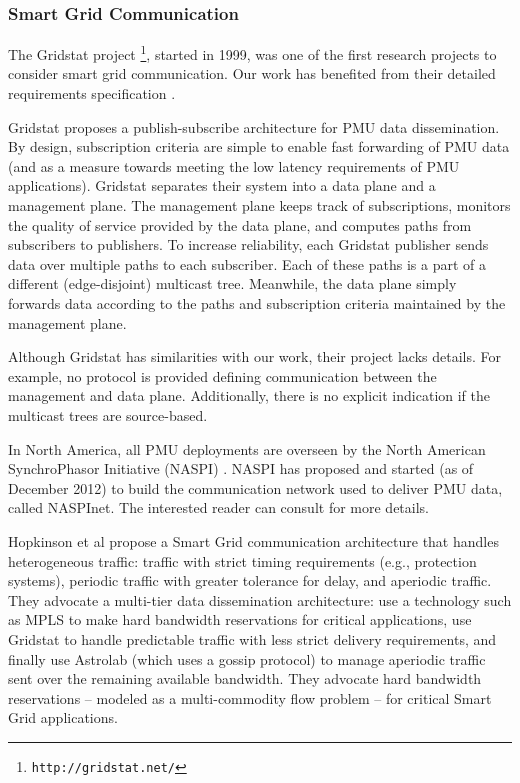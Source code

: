 \subsubsection{Smart Grid Communication}


The Gridstat project \footnote{{\tt http://gridstat.net/}}, started in 1999, was one of the first research projects to consider smart grid communication.  Our work has benefited from their %
detailed requirements specification \cite{Bakken11}.

Gridstat proposes a publish-subscribe architecture for PMU data dissemination. By design, subscription criteria are simple to enable fast forwarding of PMU data
(and as a measure towards meeting the low latency requirements of PMU applications).  
Gridstat separates their system into a data plane and a management plane. The management plane keeps track of subscriptions,
monitors the quality of service provided by the data plane, and computes paths from subscribers to publishers.  To increase reliability, each Gridstat publisher sends data over multiple paths
to each subscriber. Each of these paths is a part of a different (edge-disjoint) multicast tree.  Meanwhile, the data plane simply forwards data according to the paths and subscription 
criteria maintained by the management plane.  

Although Gridstat has similarities with our work, their project lacks details.  For example, no protocol is provided defining communication between the management and data plane. 
Additionally, there is no explicit indication if the multicast trees are source-based.

In North America, all PMU deployments are overseen by the North American SynchroPhasor Initiative (NASPI) \cite{Naspi10}.  NASPI has proposed and started (as of December 2012) to build the
communication network used to deliver PMU data, called NASPInet. The interested reader can consult \cite{Naspi10} for more details.


Hopkinson et al \cite{Hopkinson09} propose a Smart Grid communication architecture that handles heterogeneous traffic: traffic with strict timing requirements (e.g., protection systems), 
periodic traffic with greater tolerance for delay, and aperiodic traffic. They advocate a multi-tier data dissemination architecture: use a technology such as MPLS to make hard
bandwidth reservations for critical applications, use Gridstat to handle predictable traffic with less strict delivery requirements, and finally use Astrolab (which uses a gossip protocol) 
to manage aperiodic traffic sent over the remaining available bandwidth. They advocate hard bandwidth reservations -- modeled as a multi-commodity flow problem -- for critical Smart
Grid applications.




